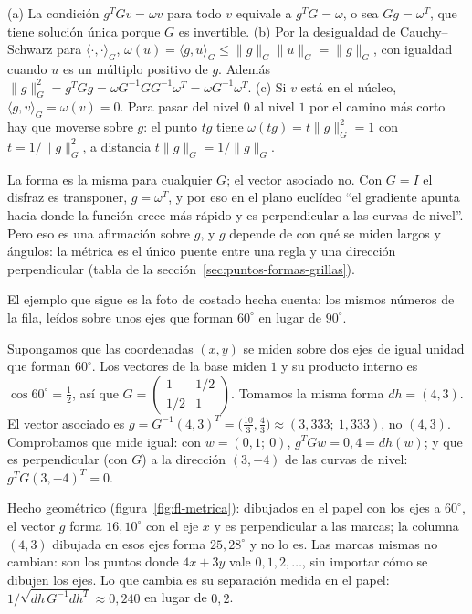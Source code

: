 \begin{demostracion}
(a) La condición \(g^TGv=\omega v\) para todo \(v\) equivale a \(g^TG=\omega\), o sea
\(Gg=\omega^T\), que tiene solución única porque \(G\) es invertible. (b) Por la desigualdad
de Cauchy--Schwarz para \(\langle\cdot,\cdot\rangle_G\),
\(\omega(u)=\langle g,u\rangle_G\le\lVert g\rVert_G\lVert u\rVert_G=\lVert g\rVert_G\), con
igualdad cuando \(u\) es un múltiplo positivo de \(g\). Además
\(\lVert g\rVert_G^2=g^TGg=\omega G^{-1}GG^{-1}\omega^T=\omega G^{-1}\omega^T\). (c) Si \(v\)
está en el núcleo, \(\langle g,v\rangle_G=\omega(v)=0\). Para pasar del nivel \(0\) al nivel
\(1\) por el camino más corto hay que moverse sobre \(g\): el punto \(tg\) tiene
\(\omega(tg)=t\lVert g\rVert_G^2=1\) con \(t=1/\lVert g\rVert_G^2\), a distancia
\(t\lVert g\rVert_G=1/\lVert g\rVert_G\).
\end{demostracion}

La forma es la misma para cualquier \(G\); el vector asociado no. Con \(G=I\) el disfraz es
transponer, \(g=\omega^T\), y por eso en el plano euclídeo \enquote{el gradiente apunta hacia
donde la función crece más rápido y es perpendicular a las curvas de nivel}. Pero eso es una
afirmación sobre \(g\), y \(g\) depende de con qué se miden largos y ángulos: la métrica es el
único puente entre una regla y una dirección perpendicular (tabla de la
sección~\ref{sec:puntos-formas-grillas}).

El ejemplo que sigue es la foto de costado hecha cuenta: los mismos números de la fila, leídos
sobre unos ejes que forman \(60^\circ\) en lugar de \(90^\circ\).

\begin{ejemplo}\label{ej:fl-metrica}
Supongamos que las coordenadas \((x,y)\) se miden sobre dos ejes de igual unidad que forman
\(60^\circ\). Los vectores de la base miden \(1\) y su producto interno es
\(\cos60^\circ=\tfrac12\), así que
\(G=\left(\begin{smallmatrix}1&1/2\\1/2&1\end{smallmatrix}\right)\). Tomamos la misma forma \(dh=(4,3)\). El vector asociado es
\(g=G^{-1}(4,3)^T=\bigl(\tfrac{10}3,\tfrac43\bigr)\approx(3{,}333;\ 1{,}333)\), no
\((4,3)\). Comprobamos que mide igual: con \(w=(0{,}1;\ 0)\),
\(g^TGw=0{,}4=dh(w)\); y que es perpendicular (con \(G\)) a la dirección \((3,-4)\) de las
curvas de nivel: \(g^TG(3,-4)^T=0\).

Hecho geométrico (figura~\ref{fig:fl-metrica}): dibujados en el papel con los ejes a
\(60^\circ\), el vector \(g\) forma \(16{,}10^\circ\) con el eje \(x\) y es perpendicular a
las marcas; la columna \((4,3)\) dibujada en esos ejes forma \(25{,}28^\circ\) y no lo es. Las
marcas mismas no cambian: son los puntos donde \(4x+3y\) vale \(0,1,2,\ldots\), sin importar
cómo se dibujen los ejes. Lo que cambia es su separación medida en el papel:
\(1/\sqrt{dh\,G^{-1}dh^T}\approx0{,}240\) en lugar de \(0{,}2\).
\end{ejemplo}

